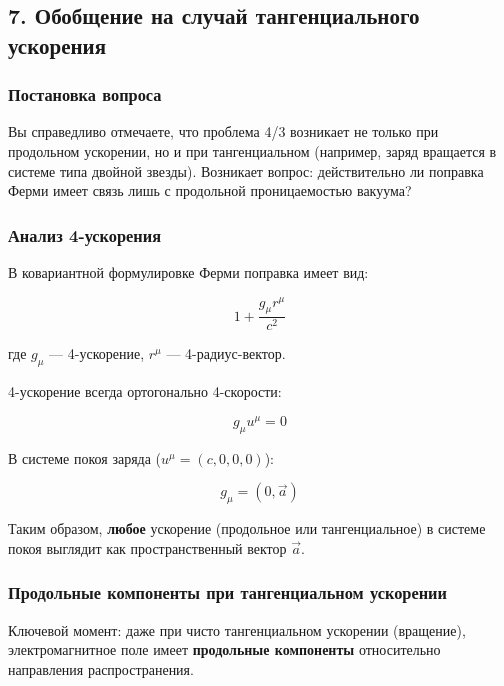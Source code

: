 \documentclass[12pt, a4paper]{article}
\begin{document}
\subsection{7. Обобщение на случай тангенциального ускорения}

\subsubsection{Постановка вопроса}

Вы справедливо отмечаете, что проблема 4/3 возникает не только при продольном ускорении, но и при тангенциальном (например, заряд вращается в системе типа двойной звезды). Возникает вопрос: действительно ли поправка Ферми имеет связь лишь с продольной проницаемостью вакуума?

\subsubsection{Анализ 4-ускорения}

В ковариантной формулировке Ферми \cite{Fermi1923} поправка имеет вид:

\begin{equation}
1 + \frac{g_\mu r^\mu}{c^2}
\label{eq:fermi_covariant}
\end{equation}

где $g_\mu$ — 4-ускорение, $r^\mu$ — 4-радиус-вектор.

4-ускорение всегда ортогонально 4-скорости:

\begin{equation}
g_\mu u^\mu = 0
\label{eq:acceleration_orthogonal}
\end{equation}

В системе покоя заряда ($u^\mu = (c, 0, 0, 0)$):

\begin{equation}
g_\mu = (0, \vec{a})
\label{eq:acceleration_rest}
\end{equation}

Таким образом, \textbf{любое} ускорение (продольное или тангенциальное) в системе покоя выглядит как пространственный вектор $\vec{a}$.

\subsubsection{Продольные компоненты при тангенциальном ускорении}

Ключевой момент: даже при чисто тангенциальном ускорении (вращение), электромагнитное поле имеет \textbf{продольные компоненты} относительно направления распространения.
\end{document}
